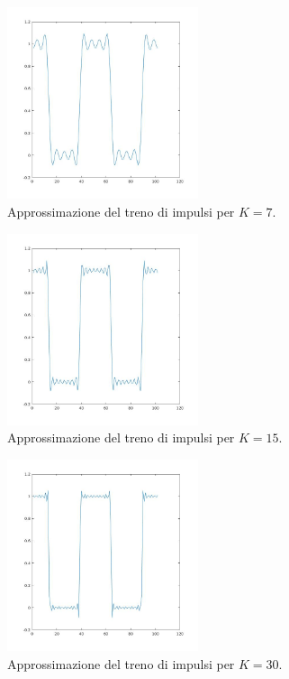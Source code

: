 \documentclass[12pt,oneside,openany]{memoir}
\numberwithin{equation}{subsection}
\begin{document}
\begin{figure}[H]
	\centering
	\captionsetup{justification=centering}
	\includegraphics[width=0.5\textwidth]{images/matlab_approssimazione_2.jpg}
	\caption{Approssimazione del treno di impulsi per $K = 7$.}
\end{figure}
\begin{figure}[H]
	\centering
	\captionsetup{justification=centering}
	\includegraphics[width=0.5\textwidth]{images/matlab_approssimazione_3.jpg}
	\caption{Approssimazione del treno di impulsi per $K = 15$.}
\end{figure}
\begin{figure}[H]
	\centering
	\captionsetup{justification=centering}
	\includegraphics[width=0.5\textwidth]{images/matlab_approssimazione_4.jpg}
	\caption{Approssimazione del treno di impulsi per $K = 30$.}
\end{figure}
\end{document}
